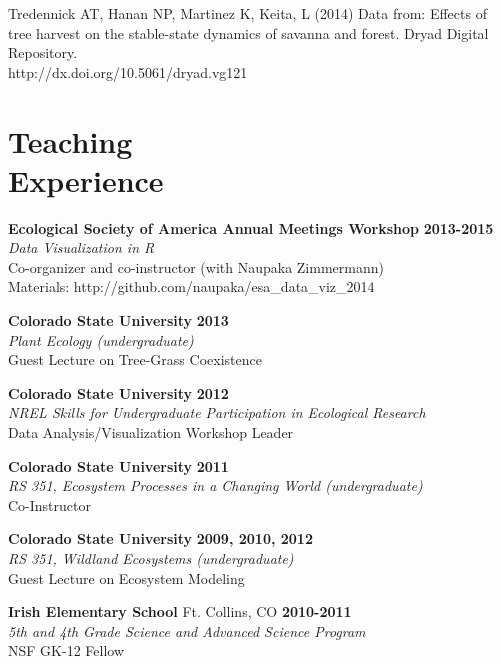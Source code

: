\documentclass[margin,line]{resume}
\begin{document}
\begin{resume}
    Tredennick AT, Hanan NP, Martinez K, Keita, L (2014) Data from: Effects of tree harvest on the stable-state dynamics of savanna and forest. Dryad Digital Repository. \\ http://dx.doi.org/10.5061/dryad.vg121
    
    \section{\mysidestyle Teaching\\Experience}
    \textbf{Ecological Society of America Annual Meetings Workshop} \hfill \textbf{2013-2015}\\
    		\textsl{Data Visualization in R}\\
		Co-organizer and co-instructor (with Naupaka Zimmermann)\\
		Materials: http://github.com/naupaka/esa\_data\_viz\_2014
    
    \textbf{Colorado State University} \hfill \textbf{2013}\\
               \textsl{Plant Ecology (undergraduate)}\\
               Guest Lecture on Tree-Grass Coexistence
               
    \textbf{Colorado State University} \hfill \textbf{2012}\\ 
               \textsl{NREL Skills for Undergraduate Participation in Ecological Research}\\
               Data Analysis/Visualization Workshop Leader
               
    \textbf{Colorado State University} \hfill \textbf{2011}\\ 
               \textsl{RS 351, Ecosystem Processes in a Changing World (undergraduate)}\\
               Co-Instructor 
               
    \textbf{Colorado State University} \hfill \textbf{2009, 2010, 2012}\\ 
               \textsl{RS 351, Wildland Ecosystems (undergraduate)}\\
               Guest Lecture on Ecosystem Modeling
               
    \textbf{Irish Elementary School} Ft. Collins, CO \hfill \textbf{2010-2011}\\ 
   		\textsl{5th and 4th Grade Science and Advanced Science Program}\\
		NSF GK-12 Fellow
		

\end{resume}
\end{document}
